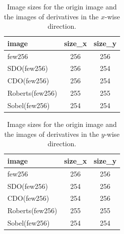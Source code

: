 \begin{table}
	\centering
    \begin{tabular}{l|cc}
    image           & size\_x & size\_y \\ \hline
    few256          & 256     & 256     \\
    SDO(few256)     & 256     & 254     \\
    CDO(few256)     & 256     & 254     \\
    Roberts(few256) & 255     & 255     \\
    Sobel(few256)   & 254     & 254     \\
    \end{tabular}
    \caption{Image sizes for the origin image and the images of derivatives in the $x$-wise direction.}
    \label{tbl:Q1:x_wise_sizes}
\end{table}

\begin{table}
	\centering
    \begin{tabular}{l|cc}
    image           & size\_x & size\_y \\ \hline
    few256          & 256     & 256     \\
    SDO(few256)     & 254     & 256     \\
    CDO(few256)     & 254     & 256     \\
    Roberts(few256) & 255     & 255     \\
    Sobel(few256)   & 254     & 254     \\
    \end{tabular}
    \caption{Image sizes for the origin image and the images of derivatives in the $y$-wise direction.}
	\label{tbl:Q1:y_wise_sizes}
\end{table}